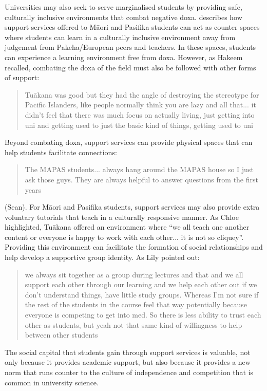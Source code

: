 Universities may also seek to serve marginalised students by providing safe, culturally inclusive environments that combat negative doxa. \cite{mayeda2014you} describes how support services offered to M\={a}ori and Pasifika students can act as counter spaces where students can learn in a culturally inclusive environment away from judgement from Pakeha/European peers and teachers. In these spaces, students can experience a learning environment free from doxa. However, as Hakeem recalled, combating the doxa of the field must also be followed with other forms of support: \blockquote{Tu\={a}kana was good but they had the angle of destroying the stereotype for Pacific Islanders, like people normally think you are lazy and all that... it didn't feel that there was much focus on actually living, just getting into uni and getting used to just the basic kind of things, getting used to uni} Beyond combating doxa, support services can provide physical spaces that can help students facilitate connections: \blockquote{The MAPAS students... always hang around the MAPAS house so I just ask those guys. They are always helpful to answer questions from the first years} (Sean). For M\={a}ori and Pasifika students, support services may also provide extra voluntary tutorials that teach in a culturally responsive manner. As Chloe highlighted, Tu\={a}kana offered an environment where ``we all teach one another content or everyone is happy to work with each other...  it is not so cliquey''. Providing this environment can facilitate the formation of social relationships and help develop a supportive group identity. As Lily pointed out: \blockquote{we always sit together as a group during lectures and that and we all support each other through our learning and we help each other out if we don’t understand things, have little study groups. Whereas I’m not sure if the rest of the students in the course feel that way potentially because everyone is competing to get into med. So there is less ability to trust each other as students, but yeah not that same kind of willingness to help between other students}. The social capital that students gain through support services is valuable, not only because it provides academic support, but also because it provides a new norm that runs counter to the culture of independence and competition that is common in university science.

